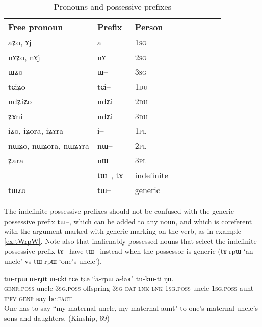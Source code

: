 \documentclass[oldfontcommands,oneside,a4paper,11pt]{article}
\newcommand{\ipa}[1]{{\phon#1}} %
\begin{document}
\begin{table}[H] \centering
\caption{Pronouns and possessive prefixes }\label{tab:pronoun}
\begin{tabular}{lllllllll} 
\toprule
 Free pronoun & Prefix & Person\\
\midrule
 \ipa{aʑo},    \ipa{ɤj} &	\ipa{a--}  &		1\textsc{sg} \\
\ipa{nɤʑo},  \ipa{nɤj} &	\ipa{nɤ--}  &			2\textsc{sg}\\
\ipa{ɯʑo}  &	\ipa{ɯ--}  &			3\textsc{sg}\\
\midrule
\ipa{tɕiʑo}  &	\ipa{tɕi--}  &			1\textsc{du} \\
\ipa{ndʑiʑo}  &	\ipa{ndʑi--}  &		2\textsc{du} \\	
\ipa{ʑɤni}  &	\ipa{ndʑi--}  &		3\textsc{du} \\	
\midrule
\ipa{iʑo}, \ipa{iʑora},   \ipa{iʑɤra}   &	\ipa{i--}  &			1\textsc{pl} \\
\ipa{nɯʑo}, \ipa{nɯʑora},   \ipa{nɯʑɤra}  &	\ipa{nɯ--}  &			2\textsc{pl} \\
\ipa{ʑara}  &	\ipa{nɯ--}  &			3\textsc{pl} \\
\midrule
&  \ipa{tɯ--},  \ipa{tɤ--} & indefinite \\
\ipa{tɯʑo} & \ipa{tɯ--}   &  generic\\
\bottomrule
\end{tabular}
\end{table}

The indefinite possessive prefixes should not be confused with the generic possessive prefix \ipa{tɯ--}, which can be added to any noun, and which is coreferent with the argument marked with generic marking on the verb, as in example \ref{ex:tWrpW}. Note also that inalienably possessed nouns that select the indefinite possessive prefix \ipa{tɤ--} have \ipa{tɯ--} instead when the possessor is generic (\ipa{tɤ-rpɯ} `an uncle' vs \ipa{tɯ-rpɯ} `one's uncle').

\begin{exe}
\ex \label{ex:tWrpW}
\gll
 \ipa{tɯ-rpɯ} 	\ipa{ɯ-rɟit} 	\ipa{ɯ-ɕki} 	\ipa{tɕe} 	\ipa{tɕe} 	``\ipa{a-rpɯ} \ipa{a-ɬaʁ}" 	\ipa{tu-kɯ-ti} 	\ipa{ŋu.} \\
\textsc{genr.poss}-uncle \textsc{3sg.poss}-offspring \textsc{3sg-dat} \textsc{lnk} \textsc{lnk} \textsc{1sg.poss}-uncle \textsc{1sg.poss}-aunt \textsc{ipfv-genr}-say  be:\textsc{fact} \\
\glt One has to say ``my maternal uncle, my maternal aunt" to one's maternal uncle's sons and daughters. (Kinship, 69)
\end{exe}
\end{document}
